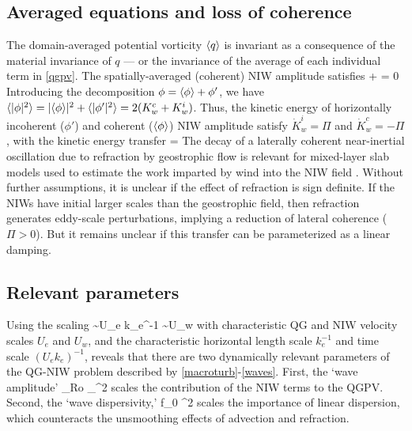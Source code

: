 \documentclass{jfm}
\begin{document}
\subsection{Averaged equations and loss of coherence}
The domain-averaged potential vorticity $\langle q \rangle$ is invariant as a consequence of
the material invariance of $q$ --- or the invariance of the average of each
individual term in \eqref{qgpv}. The spatially-averaged (coherent) NIW amplitude
satisfies
\beq
\label{phi_ave}
\la \phi \ra + \ii \left\la\half\phi\lap\psi \right\ra = 0\per
\eeq
Introducing the decomposition $\phi = \langle\phi\rangle+\phi'$, we have $\langle|\phi|^2\rangle
= |\langle\phi\rangle|^2 +
\langle|\phi'|^2\rangle = 2(K_w^c + K_w^i)$.
Thus, the kinetic energy of horizontally incoherent ($\phi'$) and coherent
($\langle\phi\rangle$) NIW amplitude satisfy $\dot{K}_w^i = \Pi$ and $\dot{K}_w^c = -\Pi$,
with the kinetic energy transfer
\beq
\label{Pi}
\Pi = \left[\la\half\phi\lap\psi\ra\la\phis\ra -
\la\half\phis\lap\psi\ra\la\phi\ra\right]\per
\eeq
The decay of a laterally coherent near-inertial oscillation due to refraction by
geostrophic flow is relevant for mixed-layer slab models used to estimate the work
imparted by wind into the NIW field \citep[e.g., ][]{alford2001}. Without further
assumptions, it is unclear if the effect of refraction is sign definite. If the
NIWs have initial larger scales than the geostrophic field, then refraction
generates eddy-scale perturbations, implying a reduction of lateral coherence
($\Pi > 0$). But it remains unclear if this transfer can be parameterized as a linear
damping.

\subsection{Relevant parameters}
Using the scaling
\beq
\psi \sim U_e k_e^{-1} \com\qquad {} \qquad \phi \sim U_w\com
\eeq
with characteristic QG and NIW velocity scales $U_e$ and $U_w$, and the
characteristic horizontal length scale $k_e^{-1}$ and time scale $(U_e k_e)^{-1}$,
reveals that there are two dynamically relevant parameters of the QG-NIW problem
described by \eqref{macroturb}-\eqref{waves}. First, the `wave amplitude'
\beq
\label{alpha}
\alpha {} {}_{ Ro} \times
{}_{ \ep^2}\com
\eeq
scales the contribution of the NIW terms to the QGPV.
Second, the `wave dispersivity,'
\beq
\label{hslash}
\hslash {} f_0 \lambda^2 \times {}\com
\eeq
scales the importance of linear dispersion, which counteracts the unsmoothing
effects of advection and refraction.
\end{document}
